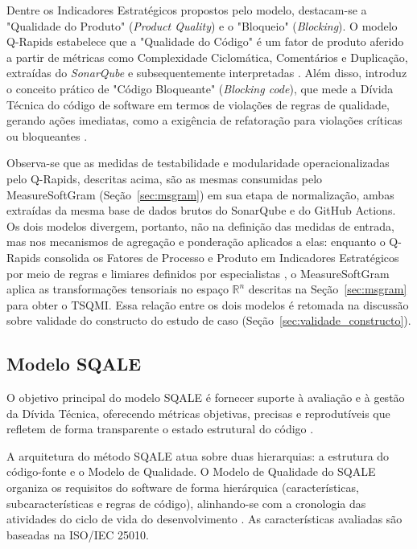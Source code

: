 Dentre os Indicadores Estratégicos propostos pelo modelo, destacam-se a "Qualidade do Produto" (\textit{Product Quality}) e o "Bloqueio" (\textit{Blocking}). O modelo Q-Rapids estabelece que a "Qualidade do Código" é um fator de produto aferido a partir de métricas como Complexidade Ciclomática, Comentários e Duplicação, extraídas do \textit{SonarQube} e subsequentemente interpretadas \cite{qrapids2019}. Além disso, introduz o conceito prático de "Código Bloqueante" (\textit{Blocking code}), que mede a Dívida Técnica do código de software em termos de violações de regras de qualidade, gerando ações imediatas, como a exigência de refatoração para violações críticas ou bloqueantes \cite{qrapids2019}.

Observa-se que as medidas de testabilidade e modularidade operacionalizadas pelo Q-Rapids, descritas acima, são as mesmas consumidas pelo MeasureSoftGram (Seção~\ref{sec:msgram}) em sua etapa de normalização, ambas extraídas da mesma base de dados brutos do SonarQube e do GitHub Actions. Os dois modelos divergem, portanto, não na definição das medidas de entrada, mas nos mecanismos de agregação e ponderação aplicados a elas: enquanto o Q-Rapids consolida os Fatores de Processo e Produto em Indicadores Estratégicos por meio de regras e limiares definidos por especialistas \cite{qrapids2019}, o MeasureSoftGram aplica as transformações tensoriais no espaço $\mathbb{R}^n$ descritas na Seção~\ref{sec:msgram} para obter o TSQMI. Essa relação entre os dois modelos é retomada na discussão sobre validade do constructo do estudo de caso (Seção~\ref{sec:validade_constructo}).

\subsection{Modelo SQALE}

O objetivo principal do modelo SQALE é fornecer suporte à avaliação e à gestão da Dívida Técnica, oferecendo métricas objetivas, precisas e reprodutíveis que refletem de forma transparente o estado estrutural do código \cite{letouzey2010}.

A arquitetura do método SQALE atua sobre duas hierarquias: a estrutura do código-fonte e o Modelo de Qualidade. O Modelo de Qualidade do SQALE organiza os requisitos do software de forma hierárquica (características, subcaracterísticas e regras de código), alinhando-se com a cronologia das atividades do ciclo de vida do desenvolvimento \cite{letouzey2010}. As características avaliadas são baseadas na ISO/IEC 25010.

